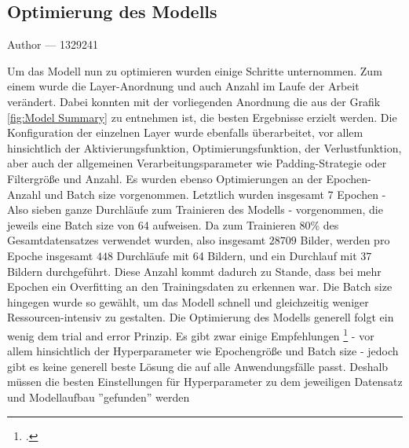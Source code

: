 \documentclass[12pt, a4paper]{report}
\makeatletter
\newcommand{\sectionauthor}[1]{%
  {\parindent0pt\vspace*{-5pt}%
  \large{Author --- }
  \linespread{1.1}\large\scshape#1%
  \par\nobreak\vspace*{35pt} }
  \@afterheading%
}
\makeatother
\begin{document}
\subsection{Optimierung des Modells}
\sectionauthor{1329241}
Um das Modell nun zu optimieren wurden einige Schritte unternommen. Zum einem wurde die Layer-Anordnung und auch Anzahl im Laufe der Arbeit verändert. Dabei konnten mit der vorliegenden Anordnung die aus der Grafik \ref{fig:Model Summary} zu entnehmen ist, die besten Ergebnisse erzielt werden. Die Konfiguration der einzelnen Layer wurde ebenfalls überarbeitet, vor allem hinsichtlich der Aktivierungsfunktion, Optimierungsfunktion, der Verlustfunktion, aber auch der allgemeinen Verarbeitungsparameter wie Padding-Strategie oder Filtergröße und Anzahl. Es wurden ebenso Optimierungen an der Epochen-Anzahl und Batch size vorgenommen. Letztlich wurden insgesamt 7 Epochen - Also sieben ganze Durchläufe zum Trainieren des Modells - vorgenommen, die jeweils eine Batch size von  64 aufweisen. Da zum Trainieren 80\% des Gesamtdatensatzes verwendet wurden, also insgesamt $ 28709 $ Bilder, werden pro Epoche insgesamt $ 448 $ Durchläufe mit 64 Bildern, und ein Durchlauf mit $ 37 $ Bildern durchgeführt. Diese Anzahl kommt dadurch zu Stande, dass bei mehr Epochen ein Overfitting an den Trainingsdaten zu erkennen war. Die Batch size hingegen wurde so gewählt, um das Modell schnell und gleichzeitig weniger Ressourcen-intensiv zu gestalten. Die Optimierung des Modells generell folgt ein wenig dem trial and error Prinzip. Es gibt zwar einige Empfehlungen 
\footcite[Vgl.][]{ModellOptimierung}
 - vor allem hinsichtlich der Hyperparameter wie Epochengröße und Batch size - jedoch gibt es keine generell beste Lösung die auf alle Anwendungsfälle passt. Deshalb müssen die besten Einstellungen für Hyperparameter zu dem jeweiligen Datensatz und Modellaufbau ''gefunden'' werden
\end{document}
